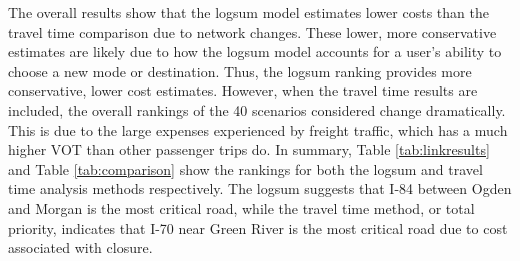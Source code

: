 The overall results show that the logsum model estimates lower costs than the
travel time comparison due to network changes. These lower, more conservative 
estimates are likely due to how the logsum model accounts for a user's
ability to choose a new mode or destination. Thus, the logsum ranking provides more
conservative, lower cost estimates. However, when the travel time results are included, the
overall rankings of the 40 scenarios considered change dramatically. This
is due to the large expenses experienced by freight traffic, which has a
much higher VOT than other passenger trips do. In summary, Table
\ref{tab:linkresults} and Table \ref{tab:comparison} show the rankings
for both the logsum and travel time analysis methods respectively. The
logsum suggests that I-84 between Ogden and Morgan is the most critical
road, while the travel time method, or total priority, indicates that I-70
near Green River is the most critical road due to cost associated with
closure.
